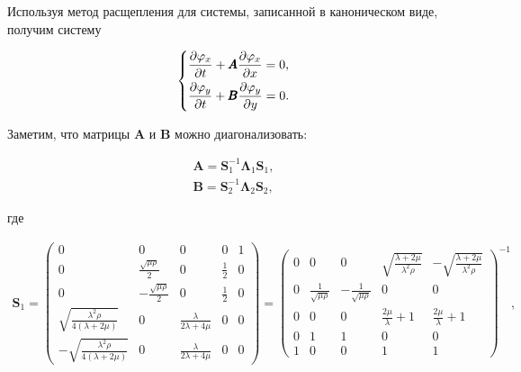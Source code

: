 \noindent Используя метод расщепления для системы, записанной в каноническом виде, получим систему

\begin{equation}
    \begin{dcases}
        \dfrac{\partial \varphi_x}{\partial t} + \pmb{A} \dfrac{\partial \varphi_x}{\partial x} = 0 , \\
        \dfrac{\partial \varphi_y}{\partial t} + \pmb{B} \dfrac{\partial \varphi_y}{\partial y} = 0 .
    \end{dcases}
    \label{eq:rashepl_elastic}
\end{equation}

\noindent Заметим, что матрицы $\pmb{A}$ и $\pmb{B}$ можно диагонализовать:

\begin{gather*}
    \pmb{A} = \pmb{S}^{-1}_1 \pmb{\Lambda}_1 \pmb{S}_1 , \\
    \pmb{B} = \pmb{S}^{-1}_2 \pmb{\Lambda}_2 \pmb{S}_2 ,
\end{gather*}

\noindent где

\begin{gather*}
    \pmb{S}_1 = 
    \begin{pmatrix}
        0 & 0 & 0 & 0 & 1 \\
        0 & \frac{\sqrt{\mu\rho}}{2} & 0 & \frac{1}{2} & 0 \\
        0 & -\frac{\sqrt{\mu\rho}}{2} & 0 & \frac{1}{2} & 0 \\
        \sqrt{\frac{\lambda^2 \rho}{4\left(\lambda+2\mu\right)}} & 0 & \frac{\lambda}{2\lambda + 4\mu} & 0 & 0 \\
        -\sqrt{\frac{\lambda^2 \rho}{4\left(\lambda+2\mu\right)}} & 0 & \frac{\lambda}{2\lambda + 4\mu} & 0 & 0
    \end{pmatrix}
    =
        \begin{pmatrix}
        0 & 0 & 0 & \sqrt{\frac{\lambda + 2\mu}{\lambda^2 \rho}} & -\sqrt{\frac{\lambda + 2\mu}{\lambda^2 \rho}} \\
        0 & \frac{1}{\sqrt{\mu\rho}} & -\frac{1}{\sqrt{\mu\rho}} & 0 & 0 \\
        0 & 0 & 0 & \frac{2\mu}{\lambda} + 1 & \frac{2\mu}{\lambda} + 1 \\
        0 & 1 & 1 & 0 & 0 \\
        1 & 0 & 0 & 1 & 1
    \end{pmatrix}^{-1}
    ,
\end{gather*}

